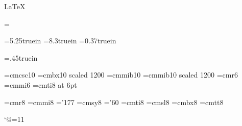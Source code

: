 %
%
\expandafter\ifx\csname LaTeX\endcsname\relax
      \let\maybe\relax
\else \immediate{}
      \immediate{}
      \makeatletter\let\maybe\@@end
\fi
\maybe


\magnification=\magstephalf

\hsize=5.25truein
\vsize=8.3truein
\hoffset=0.37truein

\newdimen\frontindent \frontindent=.45truein
\newdimen\theparindent \theparindent=20pt



\let\em=\it

\font\tencsc=cmcsc10
\font\twelvebf=cmbx10 scaled 1200
\font\bmit=cmmib10  \font\twelvebmit=cmmib10 scaled 1200
\font\sixrm=cmr6 \font\sixi=cmmi6 \font\sixit=cmti8 at 6pt

\font\eightrm=cmr8  \let\smallrm=\eightrm
\font\eighti=cmmi8  \let\smalli=\eighti
\skewchar\eighti='177
\font\eightsy=cmsy8
\skewchar\eightsy='60
\font\eightit=cmti8
\font\eightsl=cmsl8
\font\eightbf=cmbx8
\font\eighttt=cmtt8
%
\def\eightpoint{\textfont0=\eightrm \scriptfont0=\fiverm 
                \def\rm{\fam0\eightrm}\relax
                \textfont1=\eighti \scriptfont1=\fivei 
                \def\mit{\fam1}\def\oldstyle{\fam1\eighti}\relax
                \textfont2=\eightsy \scriptfont2=\fivesy 
                \def\cal{\fam2}\relax
                \textfont3=\tenex \scriptfont3=\tenex 
                \def\it{\fam\itfam\eightit}\let\em=\it
                \textfont\itfam=\eightit
                \def\sl{\fam\slfam\eightsl}\relax
                \textfont\slfam=\eightsl
                \def\bf{\fam\bffam\eightbf}\relax
                \textfont\bffam=\eightbf \scriptfont\bffam=\fivebf
                \def\tt{\fam\ttfam\eighttt}\relax
                \textfont\ttfam=\eighttt
                \setbox\strutbox=\hbox{\vrule
                     height7pt depth2pt width0pt}\baselineskip=9pt
                \let\smallrm=\sixrm \let\smalli=\sixi
                \rm}



\catcode`@=11
 
\def\vfootnote#1{\insert\footins\bgroup\eightpoint
     \interlinepenalty=\interfootnotelinepenalty
     \splittopskip=\ht\strutbox \splitmaxdepth=\dp\strutbox
     \floatingpenalty=20000
     \leftskip=0pt \rightskip=0pt \parskip=1pt \spaceskip=0pt \xspaceskip=0pt
     \everydisplay={}
     \smallskip\textindent{#1}\footstrut\futurelet\next\fo@t}
 
